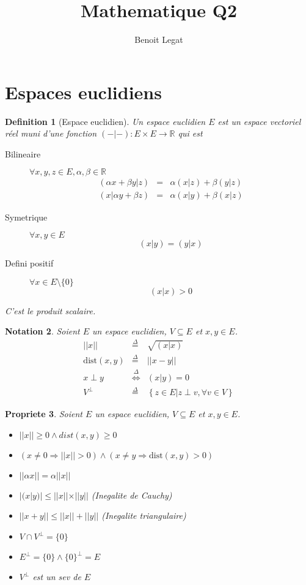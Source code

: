 \documentclass[11pt,a4paper]{article} %
\title{Mathematique Q2}
\author{Benoit Legat}
\newtheorem{defin}{Definition}[section]
\newtheorem{nota}[defin]{Notation}
\newtheorem{prop}[defin]{Propriete}
\begin{document}
\maketitle

\newcommand\dist{\mathrm{dist}}
\newcommand\Ker{\mathrm{Ker}}
\renewcommand\Im{\mathrm{Im}}

\section{Espaces euclidiens}
\begin{defin}[Espace euclidien]
	Un espace euclidien $E$ est un espace vectoriel réel muni d'une fonction
	$(-|-) : E \times E \to \mathbb{R}$ qui est
	\begin{description}
		\item[Bilineaire]
			$\forall x, y, z \in E, \alpha, \beta \in \mathbb{R}$
			\begin{eqnarray*}
				(\alpha x + \beta y | z) & = & \alpha (x | z) + \beta (y | z)\\
				(x | \alpha y + \beta z) & = & \alpha (x | y) + \beta (x | z)
			\end{eqnarray*}
		\item[Symetrique]
			$\forall x,y \in E$
			$$(x|y) = (y|x)$$
		\item[Defini positif]
			$\forall x \in E \setminus \{0\}$
			$$(x|x) > 0$$
	\end{description}
	C'est le produit scalaire.
\end{defin}

\begin{nota}
	Soient $E$ un espace euclidien, $V \subseteq E$ et $x,y \in E$.
	\begin{eqnarray*}
		||x|| & \stackrel{\Delta}{=} & \sqrt{(x|x)}\\
		\dist(x, y) & \stackrel{\Delta}{=} & ||x - y||\\
		x \perp y & \stackrel{\Delta}{\Leftrightarrow} & (x|y) = 0\\
		V^{\perp} & \stackrel{\Delta}{=} & \left\{z \in E | z \perp v, \forall v \in V\right\}
	\end{eqnarray*}
\end{nota}

\begin{prop}
	Soient $E$ un espace euclidien, $V \subseteq E$ et $x,y \in E$.
	\begin{itemize}
		\item $||x|| \geq 0 \land dist(x, y) \geq 0$
		\item $(x \neq 0 \Rightarrow ||x|| > 0) \land (x \neq y \Rightarrow \dist(x, y) > 0)$
		\item $||\alpha x|| = \alpha||x||$
		\item $|(x | y)| \leq ||x||\times||y||$ (Inegalite de Cauchy)
		\item $||x + y|| \leq ||x|| + ||y||$ (Inegalite triangulaire)
		\item $V \cap V^{\perp} = \{0\}$
		\item $E^{\perp} = \{0\} \land \{0\}^{\perp} = E$
		\item $V^{\perp}$ est un sev de $E$
	\end{itemize}
\end{prop}
\end{document}
